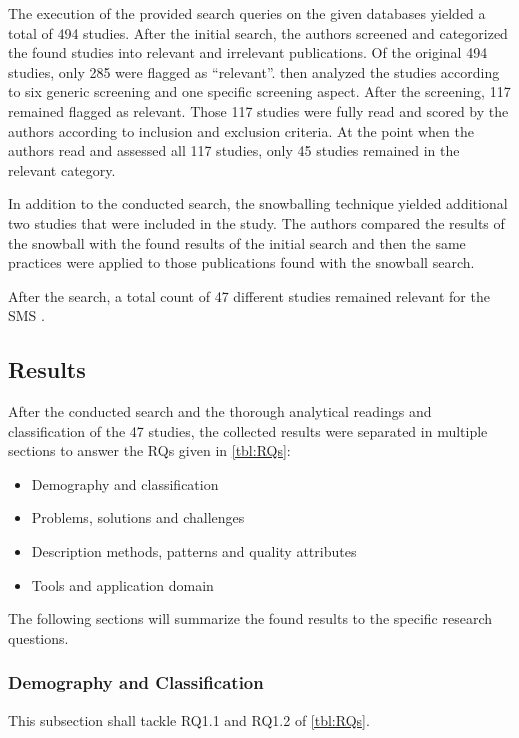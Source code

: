 The execution of the provided search queries on the given databases
yielded a total of 494 studies. After the initial search, the authors
screened and categorized the found studies into relevant and irrelevant
publications. Of the original 494 studies, only 285 were flagged as ``relevant''.
\smsAuthors then analyzed the studies according to six generic screening and one specific
screening aspect. After the screening, 117 remained flagged as relevant.
Those 117 studies were fully read and scored by the authors according to inclusion and
exclusion criteria. At the point when the authors read and assessed all 117 studies,
only 45 studies remained in the relevant category.

In addition to the conducted search, the snowballing technique
yielded additional two studies that were included in the study.
The authors compared the results of the snowball with the found results of the
initial search and then the same practices were applied to those
publications found with the snowball search.

After the search, a total count of 47 different studies remained
relevant for the SMS \cite{waseem:SMSMSADevOps}.

\subsection{Results}

After the conducted search and the thorough analytical readings and classification
of the 47 studies, the collected results were separated in multiple sections
to answer the RQs given in \autoref{tbl:RQs}:

\begin{itemize}
    \item Demography and classification
    \item Problems, solutions and challenges
    \item Description methods, patterns and quality attributes
    \item Tools and application domain
\end{itemize}

The following sections will summarize the found results to
the specific research questions.

\subsubsection{Demography and Classification}

This subsection shall tackle RQ1.1 and RQ1.2 of \autoref{tbl:RQs}.

